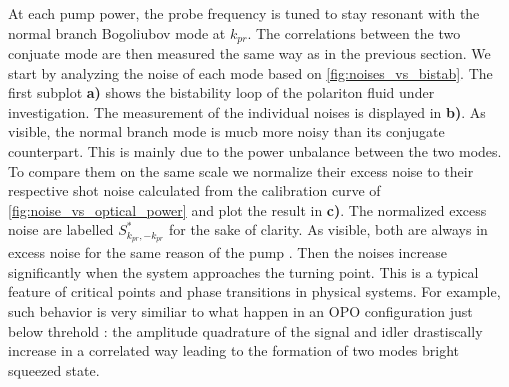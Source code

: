 At each pump power, the probe frequency is tuned to stay resonant with the normal branch Bogoliubov mode at $k_{pr}$. The correlations between the two conjuate mode are then measured the same way as in the previous section. 
We start by analyzing the noise of each mode based on \autoref{fig:noises_vs_bistab}. The first subplot \textbf{a)} shows the bistability loop of the polariton fluid under investigation. 
The measurement of the individual noises is displayed in \textbf{b)}. As visible, the normal branch mode is mucb more noisy than its conjugate counterpart. This is mainly due to the power unbalance between the two modes. To compare them 
on the same scale we normalize their excess noise to their respective shot noise calculated from the calibration curve of \autoref{fig:noise_vs_optical_power} and plot the result in \textbf{c)}. The normalized excess noise are labelled $S_{k_{pr},-k_{pr}}^*$ for the sake of clarity. As visible, both are always in excess noise for the same reason of the pump \cite{a_baas_quantum_degeneracy2006}. Then the noises increase significantly when the system
approaches the turning point. This is a typical feature of critical points and phase transitions in physical systems. For example, such behavior is very similiar to what happen in an OPO configuration just below threhold \cite{Zhang:06} : the amplitude quadrature of the signal and idler drastiscally increase in a correlated way
leading to the formation of two modes bright squeezed state. 

\bigskip


